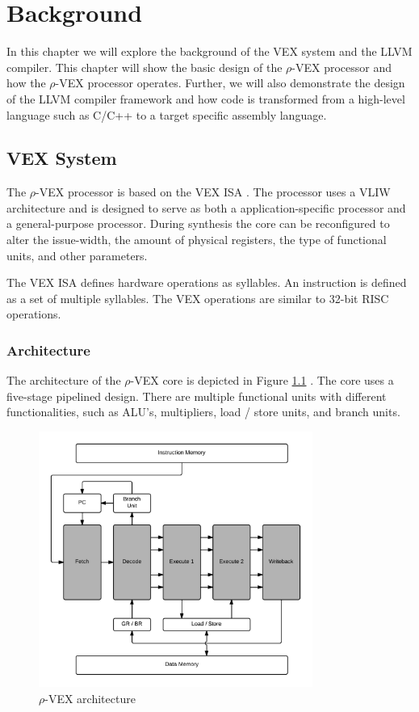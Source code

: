 \chapter{Background}
\label{chap:background}
In this chapter we will explore the background of the VEX system and the LLVM compiler. This chapter will show the basic design of the $\rho$-VEX processor and how the $\rho$-VEX processor operates. Further, we will also demonstrate the design of the LLVM compiler framework and how code is transformed from a high-level language such as C/C++ to a target specific assembly language.

\section{VEX System}
The $\rho$-VEX processor is based on the VEX ISA \cite{As:2008rt}. The processor uses a VLIW architecture and is designed to serve as both a application-specific processor and a general-purpose processor. During synthesis the core can be reconfigured to alter the issue-width, the amount of physical registers, the type of functional units, and other parameters.

The VEX ISA defines hardware operations as syllables. An instruction is defined as a set of multiple syllables. The VEX operations are similar to 32-bit RISC operations.

\subsection{Architecture}
The architecture of the $\rho$-VEX core is depicted in Figure \ref{fig:rvex_arch} \cite{Seedorf:2011fj}. The core uses a five-stage pipelined design. There are multiple functional units with different functionalities, such as ALU’s, multipliers, load / store units, and branch units.

\begin{figure}[ht]
\centering
\includegraphics[width=0.8\textwidth]{2_background/img/rvex_arch.png}
\caption{$\rho$-VEX architecture \cite{Roel-Seedorf:2012qf}}
\label{fig:rvex_arch}
\end{figure}

